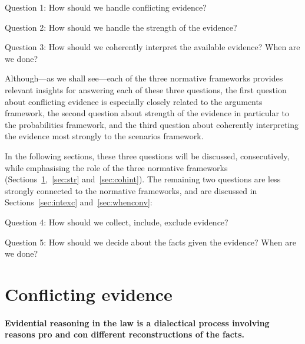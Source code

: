 \documentclass[10pt]{article}
\begin{document}
\begin{description}
	\item Question 1: How should we handle conflicting evidence?
	\item Question 2: How should we handle the strength of the evidence?
	\item Question 3: How should we coherently interpret the available evidence? 
When are we done?
\end{description}

\noindent Although---as we shall see---each of the three normative frameworks provides relevant insights for answering each of these three questions, the first question about conflicting evidence is especially closely related to the arguments framework, the second question about strength of the evidence in particular to the probabilities framework, and the third question about coherently interpreting the evidence most strongly to the scenarios framework.

In the following sections, these three questions will be discussed, consecutively, while emphasising the role of the three normative frameworks (Sections~\ref{sec:conf},~\ref{sec:str} and~\ref{sec:cohint}). The remaining two questions are less strongly connected to the normative frameworks, and are discussed in Sections~\ref{sec:intexc} and~\ref{sec:whenconv}:

\begin{description}
	\item Question 4: How should we collect, include, exclude evidence?
	\item Question 5: How should we decide about the facts given the evidence? When are we done?
\end{description}


\section{Conflicting evidence}
\label{sec:conf}
 	
\paragraph{Evidential reasoning in the law is a dialectical process involving reasons pro and con different reconstructions of the facts.} 
\end{document}
